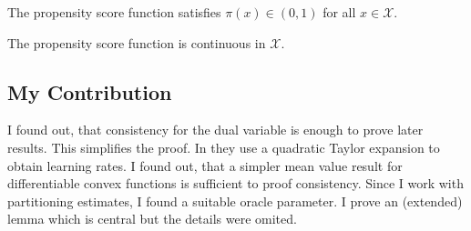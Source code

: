 \begin{assumption}
  \label{aa:assumption:overlap}
  The propensity score function satisfies
  $\pi(x)\in(0,1)$ for all $x\in\mathcal{X}$.
\end{assumption}
\begin{assumption}
  \label{aa:assumption:ps_continuous}
  The propensity score function is continuous in $\mathcal{X}$.
\end{assumption}
\subsection*{My Contribution}
I found out, that consistency for the dual variable is enough to prove later results. This simplifies the proof. 
In \cite{Wang2019} they use a quadratic Taylor expansion to obtain learning rates. I found out, that a simpler mean value result for differentiable convex functions is sufficient to proof consistency. 
Since I work with partitioning estimates, I found a suitable oracle parameter.
I prove an (extended) lemma which is central but the details were omited.

